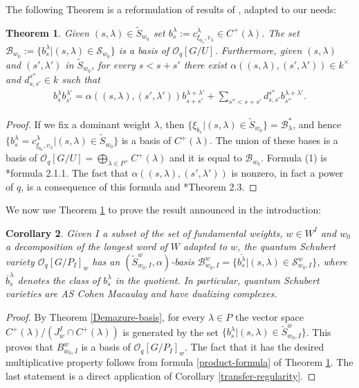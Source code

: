 \documentclass[11pt,fleqn]{article}
\theoremstyle{plain}
\newtheorem{Theorem}{Theorem}[section]
\newtheorem{Corollary}[Theorem]{Corollary}
\theoremstyle{remark}
\theoremstyle{definition}
\newcommand\B{\mathcal B}
\renewcommand\S{\mathcal S}
\renewcommand\O{\mathcal O}
\begin{document}
The following Theorem is a reformulation of results of \cite{C}, adapted to our needs:
\begin{Theorem}
\label{full-flag-basis}
Given $(s,\lambda) \in \tilde S_{w_0}$ set $b_s^\lambda := c^\lambda_{\xi_{b_s},v_\lambda} \in
C^+(\lambda)$. The set $\B_{w_0} := \{b_s^\lambda|(s,\lambda)\in \S_{w_0}\}$ is a basis of
$\O_q[G/U]$. Furthermore, given $(s,\lambda)$ and $(s',\lambda')$ in $\tilde S_{w_0}$, for every
$s < s+s'$ there exist $\alpha((s,\lambda), (s',\lambda')) \in k^\times$ and $d_{s,s'}^{s''}
\in k$ such that
		\begin{align}
		\label{product-formula}
		b_{s}^\lambda b_{s'}^{\lambda'} = \alpha((s,\lambda),(s',\lambda'))
		b_{s+s'}^{\lambda + \lambda'} + \sum_{s'' < s+s'} d_{s,s'}^{s''}
		b_{s''}^{\lambda + \lambda'}.
		\end{align}
\end{Theorem}
\begin{proof}
	If we fix a dominant weight $\lambda$, then $\{\xi_{b_s} |(s,\lambda) \in \tilde
	S_{w_0}\} = \B_\lambda^*$, and  hence $\{b_s^{\lambda} =
	c_{\xi_{b_s},v_\lambda}^\lambda| (s,\lambda) \in \tilde S_{w_0}\}$ is a basis of
	$C^+(\lambda)$. The union of these bases is a basis of
	$\O_q[G/U] = \bigoplus_{\lambda \in P^+}C^+(\lambda)$ and it is equal to $\B_{w_0}$. 
	Formula (1) is \cite{C}*{formula 2.1.1}. The fact
	that $\alpha((s,\lambda),(s',\lambda'))$ is nonzero, in fact a power of $q$, is a
	consequence of this formula and \cite{C}*{Theorem 2.3}.
\end{proof}
We now use Theorem \ref{full-flag-basis} to prove the result announced in the introduction:
\begin{Corollary}
Given $I$ a subset of the set of fundamental weights, $w \in W^I$ and $w_0$ a
decomposition of the longest word of $W$ adapted to $w$, the quantum Schubert variety
$\O_q[G/P_I]_w$ has an $(\tilde S_{w_0,I}^w, \alpha)$-basis $\B_{w_0,I}^w =
\{\overline{b_s^\lambda}|(s,\lambda) \in \S_{w_0,I}^w\}$, where $\overline b_s^\lambda$
denotes the class of $b_s^\lambda$ in the quotient. In particular, quantum Schubert
varieties are AS Cohen Macaulay and have dualizing complexes.
\end{Corollary}
\begin{proof}
	By Theorem \ref{Demazure-basis}, for every $\lambda \in P$ the vector space
	$C^+(\lambda)/(J^I_w \cap C^+(\lambda))$ is generated by the set
	$\{b^\lambda_s|(s,\lambda) \in \tilde S_{w_0,I}^w\}$. This proves that
	$B_{w_0,I}^w$ is a basis of $\O_q[G/P_I]_w$. The fact that it has the desired
	multiplicative property follows from formula \ref{product-formula} of Theorem
	\ref{full-flag-basis}. The last statement is a direct application of Corollary
	\ref{transfer-regularity}.
\end{proof}
\end{document}
